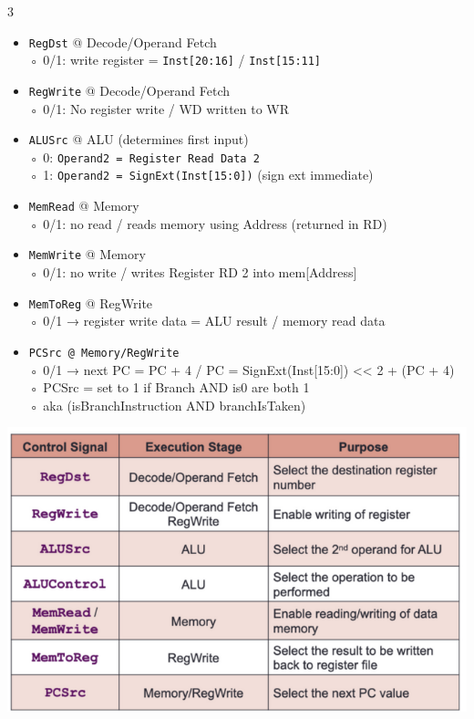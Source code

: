 \documentclass[12pt, landscape]{article}
\newcommand{\code}[1]{\colorbox{gray!25!}{\lstinline[basicstyle=\scriptsize]|#1|}}
\begin{document}
\begin{multicols*}{3}
\begin{itemize}
\item \code{RegDst} @ Decode/Operand Fetch \\
◦ 0/1: write register = \code{Inst[20:16]} / \code{Inst[15:11]}
\item \code{RegWrite} @ Decode/Operand Fetch \\
◦ 0/1: No register write / WD written to WR
\item \code{ALUSrc} @ ALU (determines first input) \\
◦ 0: \code{Operand2 = Register Read Data 2} \\
◦ 1: \code{Operand2 = SignExt(Inst[15:0])} (sign ext immediate)
\item \code{MemRead} @ Memory \\
◦ 0/1: no read / reads memory using Address (returned in RD)
\item \code{MemWrite} @ Memory \\
◦ 0/1: no write / writes Register RD 2 into mem[Address]
\item \code{MemToReg} @ RegWrite \\
◦ 0/1 → register write data = ALU result / memory read data
\item \code{PCSrc @ Memory/RegWrite} \\
◦ 0/1 → next PC = PC + 4 / PC = SignExt(Inst[15:0]) << 2 + (PC + 4) \\
◦ PCSrc = set to 1 if Branch AND is0 are both 1 \\
◦ aka (isBranchInstruction AND branchIsTaken)
\end{itemize}
\centerline{\includegraphics[width=0.9\linewidth]{signals1}}


\end{multicols*}
\end{document}
